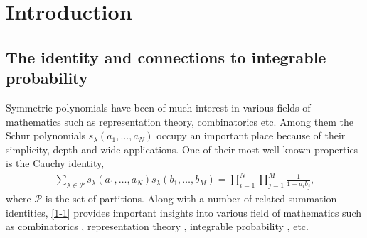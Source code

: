 \documentclass[11pt]{article}
\numberwithin{equation}{section}
\numberwithin{equation}{section}
\def\l{\lambda}
\def\Pe{\mathcal{P}}
\begin{document}
\section{Introduction}
\label{s1}

\subsection{The identity and connections to integrable probability}
 Symmetric polynomials have been of much interest in various fields of mathematics such as representation theory, combinatorics etc. Among them the Schur polynomials $s_{\l}(a_1,\dots,a_N)$ occupy an important place because of their simplicity, depth and wide applications. One of their most well-known properties
 is the Cauchy identity,
\begin{align}
\label{1-1}
 \sum_{\l\in\Pe}s_{\l}(a_1,\dots,a_N)s_{\l}(b_1,\dots,b_M)
 =
 \prod_{i=1}^N\prod_{j=1}^M\frac{1}{1-a_ib_j},
\end{align}
 where $\Pe$ is the set of partitions.
 Along with a number of related summation identities, \eqref{1-1} provides important insights into various field of mathematics such as combinatorics \cite{Sagan2000symmetricgroup}, representation theory \cite{Bump2013Liegroups}, integrable probability \cite{BorodinGorin2016IntegrableProbability}, etc.
\end{document}
